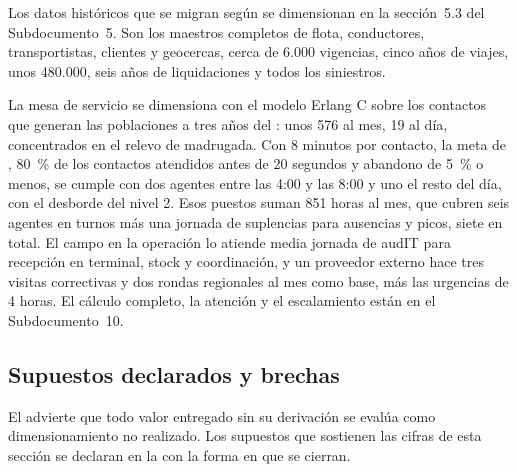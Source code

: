 Los datos históricos que se migran según  se dimensionan en la sección~5.3 del
Subdocumento~5. Son los maestros completos de flota, conductores, transportistas, clientes y
geocercas, cerca de 6.000 vigencias, cinco años de viajes, unos 480.000, seis años de liquidaciones y
todos los siniestros.

La mesa de servicio se dimensiona con el modelo Erlang C sobre los contactos que generan las
poblaciones a tres años del : unos 576 al mes, 19 al día, concentrados en el
relevo de madrugada. Con 8 minutos por contacto, la meta de , 80~\% de los
contactos atendidos antes de 20 segundos y abandono de 5~\% o menos, se cumple con dos agentes entre
las 4:00 y las 8:00 y uno el resto del día, con el desborde del nivel 2. Esos puestos suman 851 horas
al mes, que cubren seis agentes en turnos más una jornada de suplencias para ausencias y picos, siete
en total. El campo en la operación lo atiende media jornada de audIT para recepción en terminal, stock
y coordinación, y un proveedor externo hace tres visitas correctivas y dos rondas regionales al mes como
base, más las urgencias de 4 horas. El cálculo completo, la atención y el escalamiento están en el
Subdocumento~10.

\subsection{Supuestos declarados y brechas}\label{sec:4-supuestos}

El  advierte que todo valor entregado sin su derivación se evalúa como
dimensionamiento no realizado. Los supuestos que sostienen las cifras de esta sección se declaran en la
 con la forma en que se cierran.

